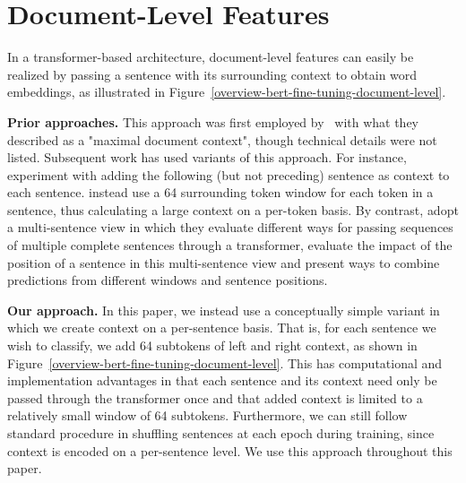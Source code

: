 \documentclass[11pt,a4paper]{article}
\begin{document}
\section{Document-Level Features}

In a transformer-based architecture, document-level features can easily be realized by passing a sentence with its surrounding context to obtain word embeddings, as illustrated in Figure~\ref{overview-bert-fine-tuning-document-level}. 

\noindent
\textbf{Prior approaches.}
This approach was first employed by~\citet{devlin-etal-2019-bert} with what they described as a "maximal document context", though technical details were not listed. Subsequent work has used variants of this approach. For instance, \citet{virtanen2019multilingual} experiment with adding the following (but not preceding) sentence as context to each sentence. \citet{yu-etal-2020-named} instead use a 64 surrounding token window for each token in a sentence, thus calculating a large context on a per-token basis. By contrast, \citet{luoma2020exploring} adopt a multi-sentence view in which they evaluate different ways for passing sequences of multiple complete sentences through a transformer, evaluate the impact of the position of a sentence in this multi-sentence view and present ways to combine predictions from different windows and sentence positions. 

\noindent
\textbf{Our approach.}
In this paper, we instead use a conceptually simple variant in which we create context on a per-sentence basis. That is, for each sentence we wish to classify, we add 64 subtokens of left and right context, as shown in Figure~\ref{overview-bert-fine-tuning-document-level}. This has computational and implementation advantages in that each sentence and its context need only be passed through the transformer once and that added context is limited to a relatively small window of 64 subtokens. Furthermore, we can still follow standard procedure in shuffling  sentences at each epoch during training, since context is encoded on a per-sentence level. We use this approach throughout this paper. 
\end{document}
